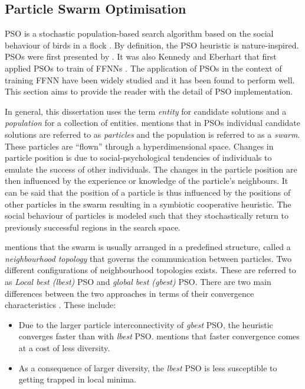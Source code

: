 \subsection{Particle Swarm Optimisation}
\label{sec:heuristics:mh:pso}

\Ac{PSO} is a stochastic population-based search algorithm based on the social behaviour of birds in a flock \cite{ref:kennedy:1995}. By definition, the \ac{PSO} heuristic is nature-inspired.  \Acp{PSO} were first presented  by \citeauthor{ref:kennedy:1995}\cite{ref:kennedy:1995}. It was also Kennedy and Eberhart that first applied \acp{PSO} to train of \acp{FFNN} \cite{ref:eberhart:1995}\cite{ref:kennedy:1997}. The application of \acp{PSO} in the context of training \ac{FFNN} have been widely studied \cite{ref:rakitianskaia:2012}\cite{ref:vanwyk:2014} and it has been found to perform well. This section aims to provide the reader with the detail of \ac{PSO} implementation.

In general, this dissertation uses the term \textit{entity} for candidate solutions and a \textit{population} for a collection of entities. \citeauthor{ref:engelbrecht:2007}\cite{ref:engelbrecht:2007} mentions that in \acp{PSO} individual candidate solutions are referred to as \textit{particles} and the population is referred to as a \textit{swarm}. These particles are ``flown'' through a hyperdimensional space. Changes in particle position is due to social-psychological tendencies of individuals to emulate the success of other individuals. The changes in the particle position are then influenced by the experience or knowledge of the particle's neighbours. It can be said that the position of a particle is thus influenced by the positions of other particles in the swarm resulting in a symbiotic cooperative heuristic. The social behaviour of particles is modeled such that they stochastically return to previously successful regions in the search space.

\citeauthor{ref:vanwyk:2014}\cite{ref:vanwyk:2014} mentions that the swarm is usually arranged in a predefined structure, called a \textit{neighbourhood topology} that governs the communication between particles. Two different configurations of neighbourhood topologies exists. These are referred to as \textit{Local best (lbest)} \ac{PSO} and \textit{global best (gbest)} \ac{PSO}. There are two main differences between the two approaches in terms of their convergence characteristics \cite{ref:eberhart:1996}. These include:

\begin{itemize}
    \item Due to the larger particle interconnectivity of \textit{gbest} \ac{PSO}, the heuristic converges faster than with \textit{lbest} \ac{PSO}. \cite{ref:engelbrecht:2007} mentions that faster convergence comes at a cost of less diversity.
    \item As a consequence of larger diversity, the \textit{lbest} \ac{PSO} is less susceptible to getting trapped in local minima.
\end{itemize}

